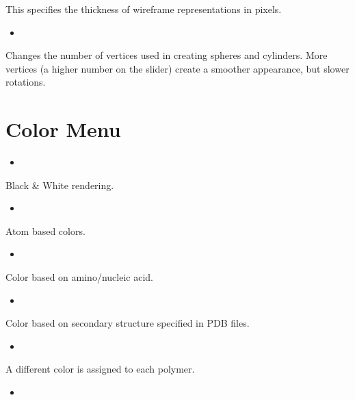 \documentclass[letterpaper,11pt,english]{sphinxmanual}
\begin{document}
\sphinxAtStartPar
This specifies the thickness of wireframe representations in pixels.
\begin{itemize}
\item {} 
\sphinxAtStartPar
{}

\end{itemize}

\sphinxAtStartPar
Changes the number of vertices used in creating spheres and cylinders. More vertices (a higher number on the slider) create a smoother appearance, but slower rotations.


\section{Color Menu}
\label{\detokenize{text/menus:color-menu}}\begin{itemize}
\item {} 
\sphinxAtStartPar
{}

\end{itemize}

\sphinxAtStartPar
Black \& White rendering.
\begin{itemize}
\item {} 
\sphinxAtStartPar
{}

\end{itemize}

\sphinxAtStartPar
Atom based colors.
\begin{itemize}
\item {} 
\sphinxAtStartPar
{}

\end{itemize}

\sphinxAtStartPar
Color based on amino/nucleic acid.
\begin{itemize}
\item {} 
\sphinxAtStartPar
{}

\end{itemize}

\sphinxAtStartPar
Color based on secondary structure specified in PDB files.
\begin{itemize}
\item {} 
\sphinxAtStartPar
{}

\end{itemize}

\sphinxAtStartPar
A different color is assigned to each polymer.
\begin{itemize}
\item {} 
\sphinxAtStartPar
{}

\end{itemize}
\end{document}
